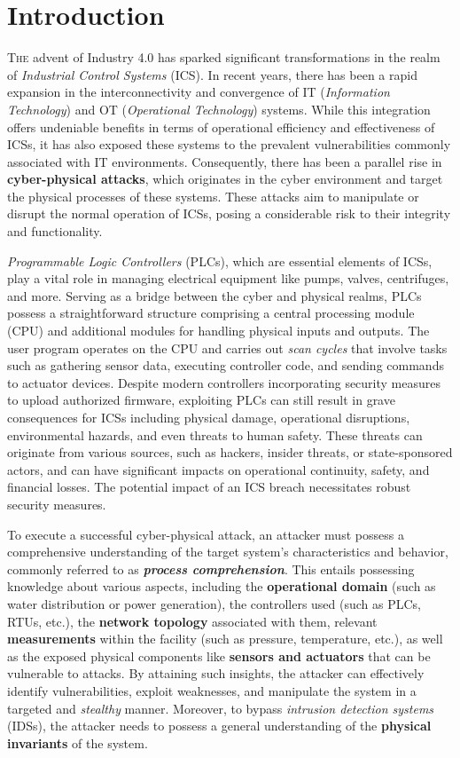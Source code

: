 \chapter{Introduction}
\label{intro}
\linenumbers

\lettrine[lines=2]{T}{he} advent of Industry 4.0 has sparked significant transformations in the realm of \textit{Industrial Control Systems} (ICS). In recent years, there has been a rapid expansion in the interconnectivity and convergence of IT (\textit{Information Technology}) and OT (\textit{Operational Technology}) systems. While this integration offers undeniable benefits in terms of operational efficiency and effectiveness of ICSs, it has also exposed these systems to the prevalent vulnerabilities commonly associated with IT environments. Consequently, there has been a parallel rise in \textbf{cyber-physical attacks}, which originates in the cyber environment and target the physical processes of these systems. These attacks aim to manipulate or disrupt the normal operation of ICSs, posing a considerable risk to their integrity and functionality.

\bigskip
\textit{Programmable Logic Controllers} (PLCs), which are essential elements of ICSs, play a vital role in managing electrical equipment like pumps, valves, centrifuges, and more. Serving as a bridge between the cyber and physical realms, PLCs possess a straightforward structure comprising a central processing module (CPU) and additional modules for handling physical inputs and outputs. The user program operates on the CPU and carries out \textit{scan cycles} that involve tasks such as gathering sensor data, executing controller code, and sending commands to actuator devices. Despite modern controllers incorporating security measures to upload authorized firmware, exploiting PLCs can still result in grave consequences for ICSs including physical damage, operational disruptions, environmental hazards, and even threats to human safety. These threats can originate from various sources, such as hackers, insider threats, or state-sponsored actors, and can have significant impacts on operational continuity, safety, and financial losses. The potential impact of an ICS breach necessitates robust security measures.

\bigskip
To execute a successful cyber-physical attack, an attacker must possess a comprehensive understanding of the target system's characteristics and behavior, commonly referred to as \textbf{\textit{process comprehension}}. This entails possessing knowledge about various aspects, including the \textbf{operational domain} (such as water distribution or power generation), the controllers used (such as PLCs, RTUs, etc.), the \textbf{network topology} associated with them, relevant \textbf{measurements} within the facility (such as pressure, temperature, etc.), as well as the exposed physical components like \textbf{sensors and actuators} that can be vulnerable to attacks. By attaining such insights, the attacker can effectively identify vulnerabilities, exploit weaknesses, and manipulate the system in a targeted and \textit{stealthy} manner. Moreover, to bypass \textit{intrusion detection systems} (IDSs), the attacker needs to possess a general understanding of the \textbf{physical invariants} of the system.

